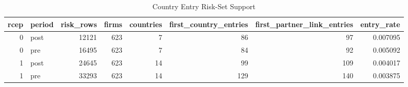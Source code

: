 \begin{table}
\caption{Country Entry Risk-Set Support}
\label{tab:table1_support_gate}
\begin{tabular}{rlrrrrrr}
\toprule
rcep & period & risk_rows & firms & countries & first_country_entries & first_partner_link_entries & entry_rate \\
\midrule
0 & post & 12121 & 623 & 7 & 86 & 97 & 0.007095 \\
0 & pre & 16495 & 623 & 7 & 84 & 92 & 0.005092 \\
1 & post & 24645 & 623 & 14 & 99 & 109 & 0.004017 \\
1 & pre & 33293 & 623 & 14 & 129 & 140 & 0.003875 \\
\bottomrule
\end{tabular}
\end{table}
